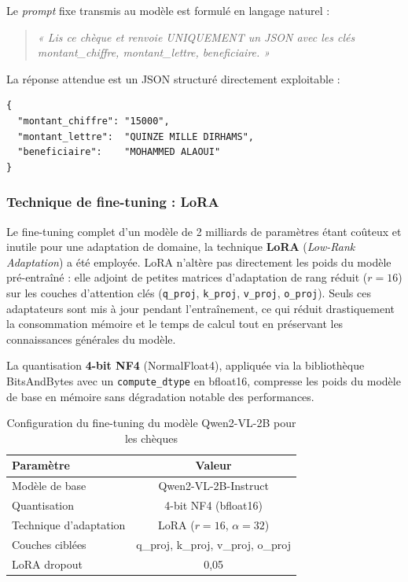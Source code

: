 Le \textit{prompt} fixe transmis au modèle est formulé en langage naturel :
\begin{quote}
\textit{« Lis ce chèque et renvoie UNIQUEMENT un JSON avec les clés
montant\_chiffre, montant\_lettre, beneficiaire. »}
\end{quote}

La réponse attendue est un JSON structuré directement exploitable :

\begin{verbatim}
{
  "montant_chiffre": "15000",
  "montant_lettre":  "QUINZE MILLE DIRHAMS",
  "beneficiaire":    "MOHAMMED ALAOUI"
}
\end{verbatim}

\subsubsection{Technique de fine-tuning : LoRA}

Le fine-tuning complet d'un modèle de 2 milliards de paramètres étant
coûteux et inutile pour une adaptation de domaine, la technique
\textbf{LoRA} (\textit{Low-Rank Adaptation}) \cite{hu2022lora} a été
employée. LoRA n'altère pas directement les poids du modèle pré-entraîné :
elle adjoint de petites matrices d'adaptation de rang réduit ($r = 16$) sur
les couches d'attention clés (\texttt{q\_proj}, \texttt{k\_proj},
\texttt{v\_proj}, \texttt{o\_proj}). Seuls ces adaptateurs sont mis à jour
pendant l'entraînement, ce qui réduit drastiquement la consommation mémoire
et le temps de calcul tout en préservant les connaissances générales du
modèle.

La quantisation \textbf{4-bit NF4} (NormalFloat4), appliquée via la
bibliothèque BitsAndBytes avec un \texttt{compute\_dtype} en bfloat16,
compresse les poids du modèle de base en mémoire sans dégradation notable
des performances.

\begin{table}[H]
\centering
\label{tab:vlm_cheque_config}
\begin{tabular}{|l|c|}
\hline
\textbf{Paramètre} & \textbf{Valeur} \\
\hline
Modèle de base            & Qwen2-VL-2B-Instruct          \\
Quantisation              & 4-bit NF4 (bfloat16)          \\
Technique d'adaptation    & LoRA ($r=16$, $\alpha=32$)    \\
Couches ciblées           & q\_proj, k\_proj, v\_proj, o\_proj \\
LoRA dropout              & 0,05                          \\
\hline
\end{tabular}
\caption{Configuration du fine-tuning du modèle Qwen2-VL-2B pour les chèques}
\end{table}

